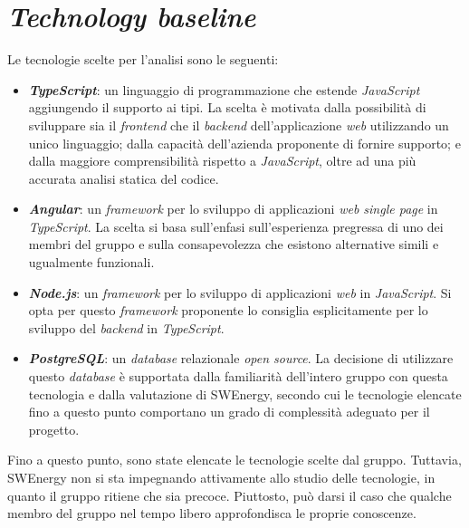 \section{\textit{Technology baseline}}
Le tecnologie scelte per l'analisi sono le seguenti:

\begin{itemize}
	\item \textbf{\textit{TypeScript}}: un linguaggio di programmazione che
	      estende \textit{JavaScript} aggiungendo il supporto ai tipi. La scelta
	      è motivata dalla possibilità di sviluppare sia il \textit{frontend}
	      che il \textit{backend} dell'applicazione \textit{web} utilizzando un
	      unico linguaggio; dalla capacità dell'azienda proponente di fornire
	      supporto; e dalla maggiore comprensibilità rispetto a
	      \textit{JavaScript}, oltre ad una più accurata analisi statica del
	      codice.

	\item \textbf{\textit{Angular}}: un \textit{framework} per lo sviluppo di
	      applicazioni \textit{web single page} in \textit{TypeScript}. La
	      scelta si basa sull'enfasi sull'esperienza pregressa di uno dei membri
	      del gruppo e sulla consapevolezza che esistono alternative simili e
	      ugualmente funzionali.

	\item \textbf{\textit{Node.js}}: un \textit{framework} per lo sviluppo di
	      applicazioni \textit{web} in \textit{JavaScript}. Si opta per questo
	      \textit{framework} proponente lo consiglia esplicitamente per lo
	      sviluppo del \textit{backend} in \textit{TypeScript}.

	\item \textbf{\textit{PostgreSQL}}: un \textit{database} relazionale
	      \textit{open source}. La decisione di utilizzare questo
	      \textit{database} è supportata dalla familiarità dell'intero gruppo
	      con questa tecnologia e dalla valutazione di SWEnergy, secondo cui le
	      tecnologie elencate fino a questo punto comportano un grado di
	      complessità adeguato per il progetto.
\end{itemize}

Fino a questo punto, sono state elencate le tecnologie scelte dal gruppo.
Tuttavia, SWEnergy non si sta impegnando attivamente allo studio delle
tecnologie, in quanto il gruppo ritiene che sia precoce. Piuttosto, può darsi
il caso che qualche membro del gruppo nel tempo libero approfondisca le proprie
conoscenze.
